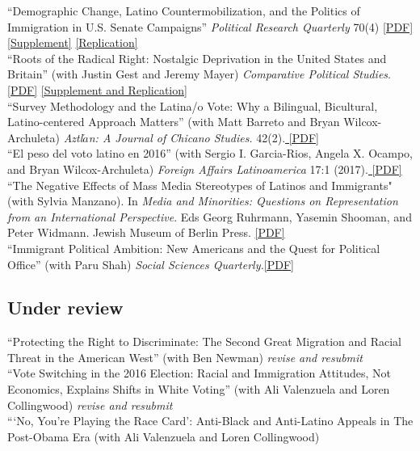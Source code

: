 \documentclass[11pt, a4paper]{article}
\newcommand{\years}[1]{\marginnote{\scriptsize #1}}
\begin{document}
\years{2017}``Demographic Change, Latino Countermobilization, and the Politics of Immigration in U.S. Senate Campaigns'' \textit{Political Research Quarterly} 70(4) \href{http://tylerreny.github.io/pdf/pubs/reny_2017_prq_final.pdf}{[PDF]} \href{http://tylerreny.github.io/pdf/pubs/reny_2017_prq_final_supp.pdf}{[Supplement]} \href{https://github.com/tylerreny/tylerreny.github.io/tree/master/replication/PRQ_2017}{[Replication]} \\
\years{2017}``Roots of the Radical Right: Nostalgic Deprivation in the United States and Britain'' (with Justin Gest and Jeremy Mayer) \textit{Comparative Political Studies}. \href{http://tylerreny.github.io/pdf/pubs/reny_2017_cps_final.pdf}{[PDF]} \href{https://github.com/tylerreny/tylerreny.github.io/tree/master/replication/CPS_2017}{[Supplement and Replication]}\\
\years{2017} ``Survey Methodology and the Latina/o Vote: Why a Bilingual, Bicultural, Latino-centered Approach Matters'' (with Matt Barreto and Bryan Wilcox-Archuleta) \textit{Aztl$\acute{a}$n: A Journal of Chicano Studies.} 42(2).\href{http://tylerreny.github.io/pdf/pubs/reny_2017_aztlan_final.pdf}{ [PDF]}\\
\years{2017} ``El peso del voto latino en 2016'' (with Sergio I. Garcia-Rios, Angela X. Ocampo, and Bryan Wilcox-Archuleta) \textit{Foreign Affairs Latinoamerica} 17:1 (2017).\href{http://tylerreny.github.io/pdf/pubs/reny_et_al_2017_foreign_affairs.pdf}{ [PDF]}\\
\years{2016} ``The Negative Effects of Mass Media Stereotypes of Latinos and Immigrants" (with Sylvia Manzano). In \textit{Media and Minorities: Questions on Representation from an International Perspective}. Eds Georg Ruhrmann, Yasemin Shooman, and Peter Widmann. Jewish Museum of Berlin Press. \href{http://tylerreny.github.io/pdf/pubs/reny_manzano_stereotypes_2016.pdf}{[PDF]}\\
\years{2016} ``Immigrant Political Ambition:  New Americans and the Quest for Political Office'' (with Paru Shah) \textit{Social Sciences Quarterly.}\href{http://tylerreny.github.io/pdf/pubs/reny_shah_2018_ssq_immigrant_ambition.pdf}{[PDF]}\\


\subsection*{Under review}

\years{}``Protecting the Right to Discriminate: The Second Great Migration and Racial Threat in the American West'' (with Ben Newman) \textit{revise and resubmit}\\
\years{}``Vote Switching in the 2016 Election: Racial and Immigration Attitudes, Not Economics, Explains Shifts in White Voting'' (with Ali Valenzuela and Loren Collingwood) \textit{revise and resubmit}\\
\years{}```No, You’re Playing the Race Card': Anti-Black and Anti-Latino Appeals in The Post-Obama Era (with Ali Valenzuela and Loren Collingwood)\\
\end{document}
